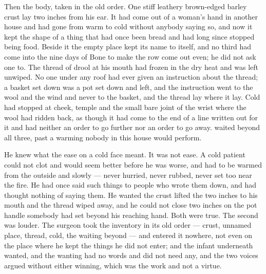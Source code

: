 Then the body, taken in the old order. One stiff leathery brown-edged barley crust lay two inches from his ear. It had come out of a woman's hand in another house and had gone from warm to cold without anybody saying so, and now it kept the shape of a thing that had once been bread and had long since stopped being food. Beside it the empty place kept its name to itself, and no third had come into the nine days of Bone to make the row come out even; he did not ask one to. The thread of drool at his mouth had frozen in the dry heat and was left unwiped. No one under any roof had ever given an instruction about the thread; a basket set down was a pot set down and left, and the instruction went to the wool and the wind and never to the basket, and the thread lay where it lay. Cold had stopped at cheek, temple and the small bare joint of the wrist where the wool had ridden back, as though it had come to the end of a line written out for it and had neither an order to go further nor an order to go away.  waited beyond all three, past a warming nobody in this house would perform.

He knew what the ease on a cold face meant. It was not ease. A cold patient could not clot and would seem better before he was worse, and had to be warmed from the outside and slowly --- never hurried, never rubbed, never set too near the fire. He had once said such things to people who wrote them down, and had thought nothing of saying them. He wanted the crust lifted the two inches to his mouth and the thread wiped away, and he could not close two inches on the pot handle somebody had set beyond his reaching hand. Both were true. The second was louder. The surgeon took the inventory in its old order --- crust, unnamed place, thread, cold, the waiting beyond --- and entered it nowhere, not even on the place where he kept the things he did not enter; and the infant underneath wanted, and the wanting had no words and did not need any, and the two voices argued without either winning, which was the work and not a virtue.

